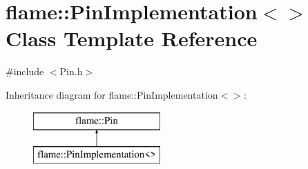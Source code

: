 \hypertarget{classflame_1_1_pin_implementation}{\section{flame\-:\-:Pin\-Implementation$<$$>$ Class Template Reference}
\label{classflame_1_1_pin_implementation}
}


{\ttfamily \#include $<$Pin.\-h$>$}

Inheritance diagram for flame\-:\-:Pin\-Implementation$<$$>$\-:\begin{figure}[H]
\begin{center}
\leavevmode
\includegraphics[height=2.000000cm]{classflame_1_1_pin_implementation}
\end{center}
\end{figure}
